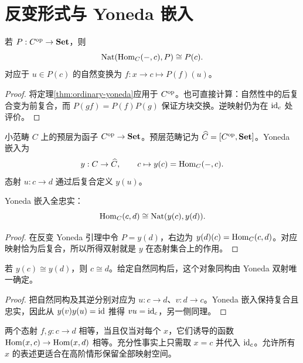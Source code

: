 \section{反变形式与 Yoneda 嵌入}
\begin{theorem}[反变 Yoneda 引理]
若 $P:C^{\mathrm{op}}\to\mathbf{Set}$，则
\[
\operatorname{Nat}(\operatorname{Hom}_C(-,c),P)\cong P(c).
\]
对应于 $u\in P(c)$ 的自然变换为 $f:x\to c\mapsto P(f)(u)$。
\end{theorem}
\begin{proof}
将定理\ref{thm:ordinary-yoneda}应用于 $C^{\mathrm{op}}$。也可直接计算：自然性中的后复合变为前复合，而 $P(gf)=P(f)P(g)$ 保证方块交换。逆映射仍为在 $\operatorname{id}_c$ 处评价。
\end{proof}
\begin{definition}
小范畴 $C$ 上的预层为函子 $C^{\mathrm{op}}\to\mathbf{Set}$。预层范畴记为 $\widehat C=[C^{\mathrm{op}},\mathbf{Set}]$。Yoneda 嵌入为
\[
y:C\to\widehat C,
\qquad c\mapsto y(c)=\operatorname{Hom}_C(-,c).
\]
态射 $u:c\to d$ 通过后复合定义 $y(u)$。
\end{definition}
\begin{proposition}[全忠实性]
Yoneda 嵌入全忠实：
\[
\operatorname{Hom}_C(c,d)\cong\operatorname{Nat}(y(c),y(d)).
\]
\end{proposition}
\begin{proof}
在反变 Yoneda 引理中令 $P=y(d)$，右边为 $y(d)(c)=\operatorname{Hom}_C(c,d)$。对应映射恰为后复合，所以所得双射就是 $y$ 在态射集合上的作用。
\end{proof}
\begin{proposition}[表示对象的唯一性]
若 $y(c)\cong y(d)$，则 $c\cong d$。给定自然同构后，这个对象同构由 Yoneda 双射唯一确定。
\end{proposition}
\begin{proof}
把自然同构及其逆分别对应为 $u:c\to d$、$v:d\to c$。Yoneda 嵌入保持复合且忠实，因此从 $y(v)y(u)=\operatorname{id}$ 推得 $vu=\operatorname{id}_c$，另一侧同理。
\end{proof}
\begin{example}[通过所有测试对象辨别映射]
两个态射 $f,g:c\to d$ 相等，当且仅当对每个 $x$，它们诱导的函数 $\operatorname{Hom}(x,c)\to\operatorname{Hom}(x,d)$ 相等。充分性事实上只需取 $x=c$ 并代入 $\operatorname{id}_c$。允许所有 $x$ 的表述更适合在高阶情形保留全部映射空间。
\end{example}

